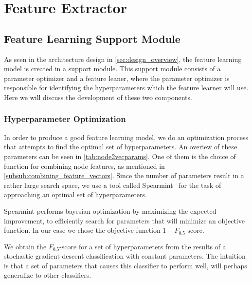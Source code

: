 \section{Feature Extractor}\label{feature_extractor}





\subsection{Feature Learning Support Module}
As seen in the architecture design in \cref{sec:design_overview}, the feature learning model is created in a support module. This support module consists of a parameter optimizer and a feature leaner, where the parameter optimizer is responsible for identifying the hyperparameters which the feature learner will use. Here we will discuss the development of these two components.

\subsubsection{Hyperparameter Optimization}\label{sec:hyperopt}
In order to produce a good feature learning model, we do an optimization process that attempts to find the optimal set of hyperparameters. An overiew of these parameters can be seen in \cref{tab:node2vecparams}. One of them is the choice of function for combining node features, as mentioned in \cref{subsub:combining_feature_vectors}. Since the number of parameters result in a rather large search space, we use a tool called Spearmint~\cite{snoek2012practical} for the task of approaching an optimal set of hyperparameters.

Spearmint performs bayesian optimization by maximizing the expected improvement, to efficiently search for parameters that will minimize an objective function. In our case we chose the objective function $1- F_{0.5}\text{-score}$.

We obtain the $F_{0.5}\text{-score}$ for a set of hyperparameters from the results of a stochastic gradient descent classification with constant parameters. The intuition is that a set of parameters that causes this classifier to perform well, will perhaps generalize to other classifiers.

